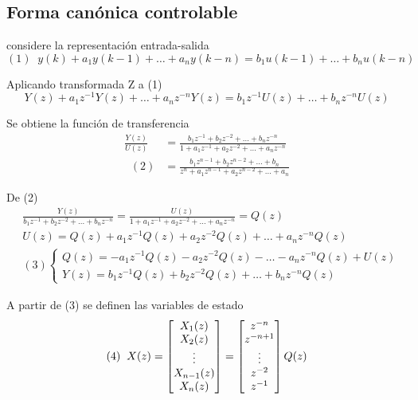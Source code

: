 \subsection{Forma canónica controlable}

considere la representación entrada-salida 
\[
    (1) \;\;
    y(k) + a_{1}y(k-1) + \ldots + a_{n}y(k-n) = b_{1}u(k-1) + \ldots + b_{n}u(k-n)
\]  

Aplicando transformada Z a (1)
\[
    Y(z) + a_{1}z^{-1}Y(z) + \ldots + a_{n}z^{-n}Y(z) = b_{1}z^{-1}U(z) + \ldots + b_{n}z^{-n}U(z)
\]

Se obtiene la función de transferencia
\[
    \begin{split}
        \frac{Y(z)}{U(z)} & = \frac{b_{1}z^{-1} + b_{2}z^{-2} + \ldots + b_{n}z^{-n}}{1 + a_{1}z^{-1} + a_{2}z^{-2} + \ldots + a_{n}z^{-n}} \\ \;\; (2)
        & = \frac{b_{1}z^{n-1} + b_{2}z^{n-2} + \ldots + b_{n}}{z^{n} + a_{1}z^{n-1} + a_{2}z^{n-2} + \ldots + a_{n}} 
    \end{split}
\]

De (2)
\[
    \begin{split}
        & \frac{Y(z)}{b_{1}z^{-1} + b_{2}z^{-2} + \ldots + b_{n}z^{-n}} = \frac{U(z)}{1 + a_{1}z^{-1} + a_{2}z^{-2} + \ldots + a_{n}z^{-n}} = Q(z) \\
        & U(z) = Q(z) + a_{1}z^{-1}Q(z) + a_{2}z^{-2}Q(z) + \ldots + a_{n}z^{-n}Q(z) \\
        & (3)
        \left\{
            \begin{array}{lll}
                Q(z) = - a_{1}z^{-1}Q(z) - a_{2}z^{-2}Q(z) - \ldots - a_{n}z^{-n}Q(z) + U(z) \\
                Y(z) = b_{1}z^{-1}Q(z) + b_{2}z^{-2}Q(z) + \ldots + b_{n}z^{-n}Q(z)
            \end{array}
        \right.
        \end{split}
\]

A partir de (3) se definen las variables de estado
\[
    (4) \;\; X(z) = 
    \begin{bmatrix}
        X_{1}(z) \\
        X_{2}(z) \\
        \vdots \\
        X_{n-1}(z) \\
        X_{n}(z)
    \end{bmatrix} =
    \begin{bmatrix}
        z^{-n} \\
        z^{-n+1} \\
        \vdots \\
        z^{-2} \\
        z^{-1}
    \end{bmatrix} Q(z) \\
\]

